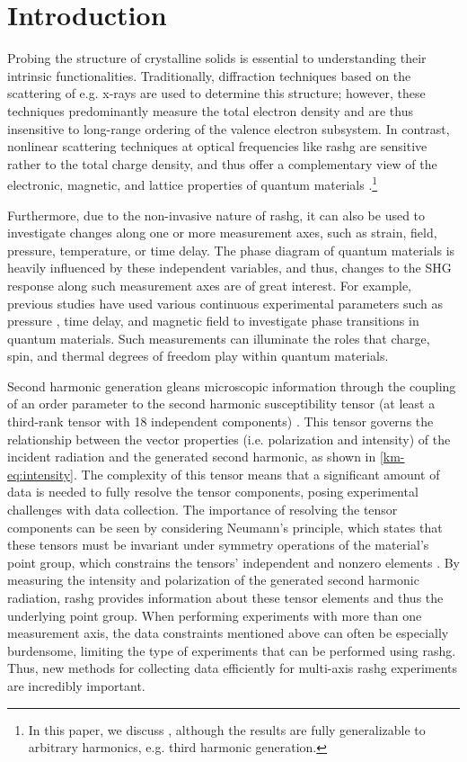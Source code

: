 \section{\label{km-sec:intro} Introduction}

Probing the structure of crystalline solids is essential to understanding their intrinsic functionalities. 
Traditionally, diffraction techniques based on the scattering of e.g. x-rays are used to determine this structure; however, these techniques predominantly measure the total electron density and are thus insensitive to long-range ordering of the valence electron subsystem.
In contrast, nonlinear scattering techniques at optical frequencies like \gls{rashg} are sensitive rather to the total charge density, and thus offer a complementary view of the electronic, magnetic, and lattice properties of quantum materials \citep{torchinsky_low_2014, fichera_second_2020}.\footnote{In this paper, we discuss , although the results are fully generalizable to arbitrary harmonics, e.g. third harmonic generation.}


Furthermore, due to the non-invasive nature of \gls{rashg}, it can also be used to investigate changes along one or more measurement axes, such as strain, field, pressure, temperature, or time delay.
The phase diagram of quantum materials is heavily influenced by these independent variables, and thus, changes to the SHG response along such measurement axes are of great interest.
For example, previous studies have used various continuous experimental parameters such as pressure \citep{li_high-pressure_2022}, time delay\citep{shan_gian_2021}, and magnetic field to investigate phase transitions in quantum materials.
Such measurements can illuminate the roles that charge, spin, and thermal degrees of freedom play within quantum materials.

Second harmonic generation gleans microscopic information through the coupling of an order parameter to the second harmonic susceptibility tensor (at least a third-rank tensor with 18 independent components) \citep{boyd}. 
This tensor governs the relationship between the vector properties (i.e. polarization and intensity) of the incident radiation and the generated second harmonic, as shown in \cref{km-eq:intensity}.
The complexity of this tensor means that a significant amount of data is needed to fully resolve the tensor components, posing experimental challenges with data collection.
The importance of resolving the tensor components can be seen by considering Neumann's principle, which states that these tensors must be invariant under symmetry operations of the material's point group, which constrains the tensors' independent and nonzero elements \citep{birss}. 
By measuring the intensity and polarization of the generated second harmonic radiation, \gls{rashg} provides information about these tensor elements and thus the underlying point group.
When performing experiments with more than one measurement axis, the data constraints mentioned above can often be especially burdensome, limiting the type of experiments that can be performed using \gls{rashg}.
Thus, new methods for collecting data efficiently for multi-axis \gls{rashg} experiments are incredibly important.


